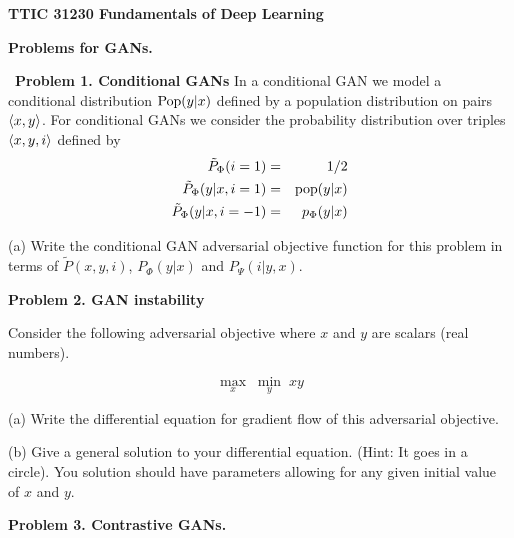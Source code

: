 \documentclass{article}
\newcommand{\solution}[1]{}
\begin{document}
\centerline{\bf TTIC 31230 Fundamentals of Deep Learning}

\bigskip

\centerline{\bf Problems for GANs.}

\bigskip
\bigskip
~{\bf Problem 1. Conditional GANs}  In a conditional GAN
we model a conditional distribution $\mathrm{Pop}(y|x)$ defined by a population distribution on pairs ${\mbox{$\langle x,y\rangle$}}$.
For conditional GANs we consider the probability distribution over triples
${\mbox{$\langle x,y,i\rangle$}}$ defined by
\begin{eqnarray*}
\tilde{P}_\Phi(i = 1) & = & 1/2 \\
\tilde{P}_\Phi(y|x,i=1) & =&  \mathrm{pop}(y|x) \\
\tilde{P}_\Phi(y|x,i=-1) & = & p_\Phi(y|x)
\end{eqnarray*}

\medskip
(a)  Write the conditional GAN adversarial objective function for this problem in terms of $\tilde{P}(x,y,i)$, $P_\Phi(y|x)$ and $P_\Psi(i|y,x)$.

\solution{
$$\Phi^* = \argmax_\Phi\;\min_\Psi \;E_{x,y,i \sim \tilde{P}(x,y,i)}\;\;-\ln P_\Psi(i|x,y)$$
}
 
\bigskip
{\bf Problem 2. GAN instability}

Consider the following adversarial objective where $x$ and $y$ are scalars (real numbers).

$$\max_x\;\min_y \;xy$$

\medskip
(a) Write the differential equation for gradient flow of this adversarial objective.

\solution{
  \begin{eqnarray*}
    \frac{dx}{dt} & = & y \\
    \\
    \frac{dy}{dt} & = & -x
  \end{eqnarray*}
}

\medskip
(b) Give a general solution to your differential equation. (Hint: It goes in a circle).  You solution should have parameters
allowing for any given initial value of $x$ and $y$.

\solution{

  \begin{eqnarray*}
    x & = & r_0\sin(t + \Theta_0) \\
    \\
    y & = & r_0\cos(t + \Theta_0)
  \end{eqnarray*}
}

\bigskip
{\bf Problem 3. Contrastive GANs.}
\end{document}
